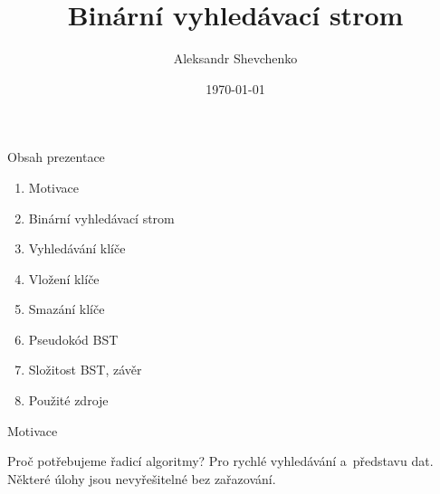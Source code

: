 \documentclass[10pt]{beamer}
\title[Short title]{\huge Binární vyhledávací strom}
\author{\Large Aleksandr Shevchenko}
\institute{\small Vysoké učení technické v~Brně\\
    Fakulta informačních technologií}
\date{\today}
\begin{document}

\begin{frame}
    \titlepage
\end{frame}

\begin{frame}{Obsah prezentace}
    \begin{enumerate}
    \item Motivace
    \item Binární vyhledávací strom
    \item Vyhledávání klíče
    \item Vložení klíče
    \item Smazání klíče
    \item Pseudokód BST
    \item Složitost BST, závěr
    \item Použité zdroje
    \end{enumerate}
\end{frame}

\begin{frame}[t]{Motivace}
    \smallskip
    \begin{block}{Proč potřebujeme řadicí algoritmy?}
    \medskip
    Pro rychlé vyhledávání a~představu dat. Některé úlohy jsou nevyřešitelné bez zařazování.
    \end{block}
    \bigskip
    \bigskip
    \begin{columns}[onlytextwidth]
    \end{columns}
\end{frame}
\end{document}
